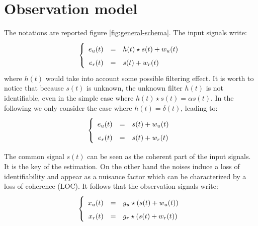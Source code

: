 \section{Observation model}
The notations are reported figure \ref{fig:general-schema}. The input signals write:
\begin{eqnarray}
\label{eq:model-of-excitation}
\left\{
\renewcommand\arraystretch{1.6}
\begin{array}{rcl}
e_{\ut}(t)&=&h(t) \star s(t)+w_{\ut}(t)
\\
e_{\rf}(t)&=&s(t)+w_{\rf}(t)
\end{array}
\right.
\end{eqnarray}
where $h(t)$ would take into account some possible filtering effect. It is worth to notice that because $s(t)$ is unknown, the unknown filter $h(t)$ is not identifiable, even in the simple case where $h(t) \star s(t)=\alpha s(t)$. In the following we only consider the case where $h(t)=\delta(t)$, leading to:
\begin{eqnarray}
\label{eq:model-of-excitation}
\left\{
\renewcommand\arraystretch{1.6}
\begin{array}{rcl}
e_{\ut}(t)&=&s(t)+w_{\ut}(t)
\\
e_{\rf}(t)&=&s(t)+w_{\rf}(t)
\end{array}
\right.
\end{eqnarray}


The common signal $s(t)$ can be seen as the coherent part of the input signals. It is the key of the estimation. On the other hand the noises induce a loss of identifiability and appear as a nuisance factor which can be characterized by a loss of coherence (LOC). It follows that the observation signals write:
\begin{eqnarray}
\label{eq:model-of-obervation}
\left\{
\renewcommand\arraystretch{1.6}
\begin{array}{rcl}
x_{\ut}(t)&=&g_{\ut} \star(s(t)+w_{\ut}(t))
\\
x_{\rf}(t)&=&g_{\rf} \star (s(t)+w_{\rf}(t))
\end{array}
\right.
\end{eqnarray}

